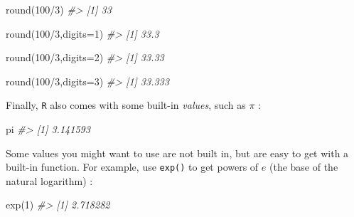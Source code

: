\documentclass[
]{book}
\newenvironment{Shaded}{\begin{snugshade}}{\end{snugshade}}
\newcommand{\AttributeTok}[1]{\textcolor[rgb]{0.77,0.63,0.00}{#1}}
\newcommand{\CommentTok}[1]{\textcolor[rgb]{0.56,0.35,0.01}{\textit{#1}}}
\newcommand{\DecValTok}[1]{\textcolor[rgb]{0.00,0.00,0.81}{#1}}
\newcommand{\FunctionTok}[1]{\textcolor[rgb]{0.00,0.00,0.00}{#1}}
\newcommand{\NormalTok}[1]{#1}
\newcommand{\SpecialCharTok}[1]{\textcolor[rgb]{0.00,0.00,0.00}{#1}}
\begin{document}
\begin{Shaded}
\begin{Highlighting}[]
\FunctionTok{round}\NormalTok{(}\DecValTok{100}\SpecialCharTok{/}\DecValTok{3}\NormalTok{)}
\CommentTok{\#\textgreater{} [1] 33}
\end{Highlighting}
\end{Shaded}

\begin{Shaded}
\begin{Highlighting}[]
\FunctionTok{round}\NormalTok{(}\DecValTok{100}\SpecialCharTok{/}\DecValTok{3}\NormalTok{,}\AttributeTok{digits=}\DecValTok{1}\NormalTok{)}
\CommentTok{\#\textgreater{} [1] 33.3}
\end{Highlighting}
\end{Shaded}

\begin{Shaded}
\begin{Highlighting}[]
\FunctionTok{round}\NormalTok{(}\DecValTok{100}\SpecialCharTok{/}\DecValTok{3}\NormalTok{,}\AttributeTok{digits=}\DecValTok{2}\NormalTok{)}
\CommentTok{\#\textgreater{} [1] 33.33}
\end{Highlighting}
\end{Shaded}

\begin{Shaded}
\begin{Highlighting}[]
\FunctionTok{round}\NormalTok{(}\DecValTok{100}\SpecialCharTok{/}\DecValTok{3}\NormalTok{,}\AttributeTok{digits=}\DecValTok{3}\NormalTok{)}
\CommentTok{\#\textgreater{} [1] 33.333}
\end{Highlighting}
\end{Shaded}

Finally, \texttt{R} also comes with some built-in \emph{values}, such as \(\pi\) :

\begin{Shaded}
\begin{Highlighting}[]
\NormalTok{pi}
\CommentTok{\#\textgreater{} [1] 3.141593}
\end{Highlighting}
\end{Shaded}

Some values you might want to use are not built in, but are easy to get with a built-in function. For example,
use \texttt{exp()} to get powers of \(e\) (the base of the natural logarithm) :

\begin{Shaded}
\begin{Highlighting}[]
\FunctionTok{exp}\NormalTok{(}\DecValTok{1}\NormalTok{)}
\CommentTok{\#\textgreater{} [1] 2.718282}
\end{Highlighting}
\end{Shaded}
\end{document}
